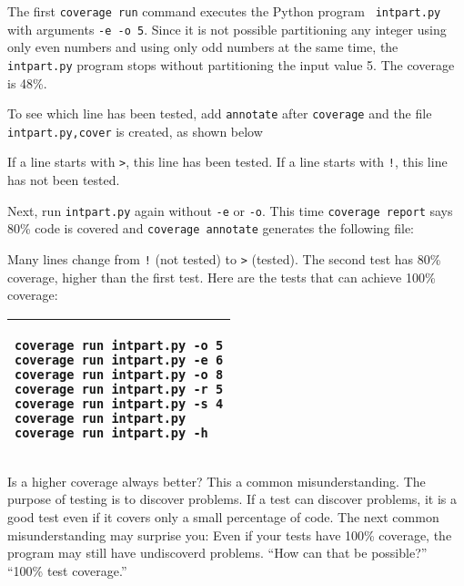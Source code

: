 {The first {\tt coverage run} command executes the Python program {\tt
  intpart.py} with arguments {\tt -e -o 5}.  Since it is not possible
partitioning any integer using only even numbers and using only odd
numbers at the same time, the {\tt intpart.py} program stops without
partitioning the input value 5. The coverage is 48\%.

To see which line has been tested, add {\tt annotate}
after {\tt coverage} and the file {\tt intpart.py,cover}
is created, as shown below

\resetlinenumber[1]
\linenumbers
\begin{tt}
  
\end{tt}
\nolinenumbers

If a line starts with {\tt >}, this line has been tested.
If a line starts with {\tt !}, this line has not been tested.

Next, run {\tt intpart.py} again without {\tt -e} or
{\tt -o}.  This time {\tt coverage report}
says 80\% code is covered and {\tt coverage annotate}
generates the following file:

\resetlinenumber[1]
\linenumbers
\begin{tt}
  
\end{tt}
\nolinenumbers

Many lines change from {\tt !} (not tested) to {\tt >} (tested).
The second test has 80\% coverage, higher than the first test.
Here are the tests that can achieve 100\% coverage:


 
\vspace{0.2in}

\noindent
\begin{tabular}{|p{5in}|}\hline
\begin{verbatim}
coverage run intpart.py -o 5
coverage run intpart.py -e 6
coverage run intpart.py -o 8
coverage run intpart.py -r 5
coverage run intpart.py -s 4
coverage run intpart.py
coverage run intpart.py -h
\end{verbatim}
\\ \hline
\end{tabular}
\vspace{0.2in}



Is a
higher coverage always better? This a common misunderstanding.  The
purpose of testing is to discover problems.  If a test can discover
problems, it is a good test even if it covers only a small percentage
of code.  The next common misunderstanding may surprise you: Even if
your tests have 100\% coverage, the program may still have undiscoverd
problems.  ``How can that be possible?'' ``100\% test coverage.''

}
